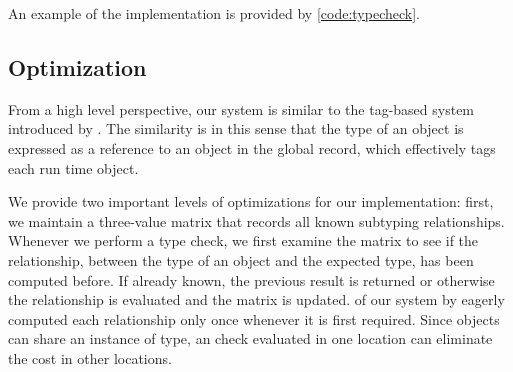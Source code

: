 An example of the implementation is provided by \cref{code:typecheck}.








\subsection{Optimization}
\label{ssec:optimization}

From a high level perspective, 
our system is similar to the tag-based system introduced by \citet{Greenman2018}.
The similarity is in this sense that the type of an object is expressed as a reference
to an object in the global record, which
effectively tags each run time object.

We provide two important levels of optimizations for our implementation: 
first, we maintain a three-value matrix that records all known subtyping relationships. 
Whenever we perform a type check, we first examine the matrix to see if the relationship, 
between the type of an object and the expected type, has been computed before.
If already known, the previous result is returned 
or otherwise the relationship is evaluated and the matrix is updated.
 of our system 
by eagerly computed each relationship only once whenever it is first required.
Since objects can share an instance of type,
an check evaluated in one location can eliminate the cost in other locations.


